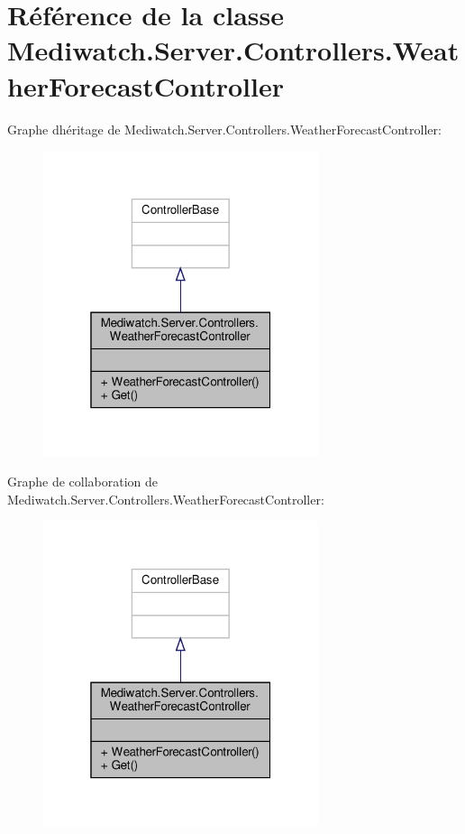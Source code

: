 \hypertarget{class_mediwatch_1_1_server_1_1_controllers_1_1_weather_forecast_controller}{}\section{Référence de la classe Mediwatch.\+Server.\+Controllers.\+Weather\+Forecast\+Controller}
\label{class_mediwatch_1_1_server_1_1_controllers_1_1_weather_forecast_controller}


Graphe d\textquotesingle{}héritage de Mediwatch.\+Server.\+Controllers.\+Weather\+Forecast\+Controller\+:
\nopagebreak
\begin{figure}[H]
\begin{center}
\leavevmode
\includegraphics[width=229pt]{class_mediwatch_1_1_server_1_1_controllers_1_1_weather_forecast_controller__inherit__graph}
\end{center}
\end{figure}


Graphe de collaboration de Mediwatch.\+Server.\+Controllers.\+Weather\+Forecast\+Controller\+:
\nopagebreak
\begin{figure}[H]
\begin{center}
\leavevmode
\includegraphics[width=229pt]{class_mediwatch_1_1_server_1_1_controllers_1_1_weather_forecast_controller__coll__graph}
\end{center}
\end{figure}
